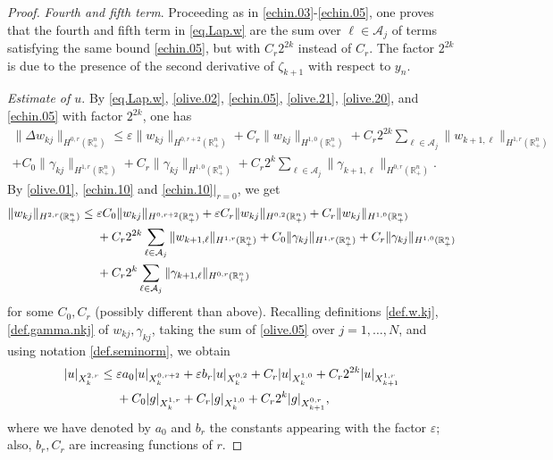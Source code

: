 \documentclass[10pt,reqno,a4paper]{article}
\numberwithin{equation}{section}
\theoremstyle{plain}
\theoremstyle{definition}
\newcommand{\R}{{\mathbb R}}
\newcommand{\mA}{\mathcal{A}}
\newcommand{\e}{\varepsilon}
\begin{document}
\begin{proof}
\emph{Fourth and fifth term}. 
Proceeding as in \eqref{echin.03}-\eqref{echin.05}, one proves that the 
fourth and fifth term in \eqref{eq.Lap.w} are the sum over $\ell \in \mA_j$ of terms 
satisfying the same bound \eqref{echin.05}, but with $C_r 2^{2k}$ instead of $C_r$. 
The factor $2^{2k}$ is due to the presence of the second derivative of $\zeta_{k+1}$ 
with respect to $y_n$. 
 

\emph{Estimate of $u$}. 
By \eqref{eq.Lap.w}, \eqref{olive.02}, \eqref{echin.05}, \eqref{olive.21}, \eqref{olive.20}, 
and \eqref{echin.05} with factor $2^{2k}$, one has 
\begin{multline}
\| \Delta w_{kj} \|_{H^{0,r}(\R^n_+)}
\leq 
\e \| w_{kj} \|_{H^{0, r+2}(\R^n_+)}
+ C_r \| w_{kj} \|_{H^{1,0}(\R^n_+)}
+ C_r 2^{2k} \sum_{\ell \in \mA_j} \| w_{k+1, \ell} \|_{H^{1,r}(\R^n_+)}
\\
+ C_0 \| \gamma_{kj} \|_{H^{1,r}(\R^n_+)} 
+ C_r \| \gamma_{kj} \|_{H^{1,0}(\R^n_+)} 
+ C_r 2^k \sum_{\ell \in \mA_j} \| \gamma_{k+1,\ell} \|_{H^{0,r}(\R^n_+)}.
\label{echin.10}
\end{multline}
By \eqref{olive.01}, \eqref{echin.10} and \eqref{echin.10}$|_{r=0}$, we get
\begin{align}
\| w_{kj} \|_{H^{2,r}(\R^n_+)}
& \leq 
\e C_0 \| w_{kj} \|_{H^{0, r+2}(\R^n_+)} 
+ \e C_r \| w_{kj} \|_{H^{0, 2}(\R^n_+)}
+ C_r \| w_{kj} \|_{H^{1,0}(\R^n_+)}
\notag \\ & \quad \ 
+ C_r 2^{2k} \sum_{\ell \in \mA_j} \| w_{k+1, \ell} \|_{H^{1,r}(\R^n_+)}
+ C_0 \| \gamma_{kj} \|_{H^{1,r}(\R^n_+)} 
+ C_r \| \gamma_{kj} \|_{H^{1,0}(\R^n_+)} 
\notag \\ & \quad \ 
+ C_r 2^k \sum_{\ell \in \mA_j} \| \gamma_{k+1,\ell} \|_{H^{0,r}(\R^n_+)}
\label{olive.05}
\end{align}
for some $C_0, C_r$ (possibly different than above).
Recalling definitions \eqref{def.w.kj}, \eqref{def.gamma.nkj} of $w_{kj}, \gamma_{kj}$,  
taking the sum of \eqref{olive.05} over $j = 1, \ldots, N$, 
and using notation \eqref{def.seminorm}, 
we obtain 
\begin{align}
|u|_{X^{2,r}_k}
& \leq \e a_0 |u|_{X^{0,r+2}_k}
+ \e b_r |u|_{X^{0,2}_k}
+ C_r |u|_{X^{1,0}_k}
+ C_r 2^{2k} |u|_{X^{1,r}_{k+1}}
\notag \\ & \quad \ 
+ C_0 |g|_{X^{1,r}_k}
+ C_r |g|_{X^{1,0}_k}
+ C_r 2^k |g|_{X^{0,r}_{k+1}},
\label{olive.09}
\end{align}
where we have denoted by $a_0$ and $b_r$ the constants appearing with the factor $\e$;
also, $b_r, C_r$ are increasing functions of $r$. 

\end{proof}
\end{document}
